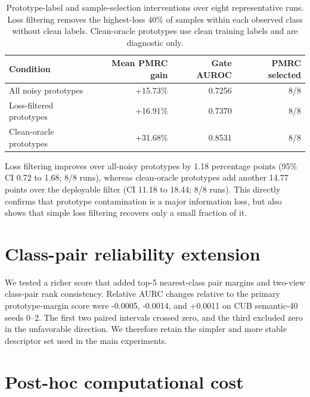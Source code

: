 \documentclass[11pt,a4paper]{article}
\begin{document}
\begin{table}[H]
\centering
\caption{Prototype-label and sample-selection interventions over eight representative runs. Loss filtering removes the highest-loss 40\% of samples within each observed class without clean labels. Clean-oracle prototypes use clean training labels and are diagnostic only.}
\label{tab:prototype-purification}
\small
\begin{tabular}{@{}lrrr@{}}
\toprule
Condition & Mean PMRC gain & Gate AUROC & PMRC selected \\
\midrule
All noisy prototypes & +15.73\% & 0.7256 & 8/8 \\
Loss-filtered prototypes & +16.91\% & 0.7370 & 8/8 \\
Clean-oracle prototypes & +31.68\% & 0.8531 & 8/8 \\
\bottomrule
\end{tabular}
\end{table}

Loss filtering improves over all-noisy prototypes by 1.18 percentage points
(95\% CI 0.72 to 1.68; 8/8 runs), whereas clean-oracle prototypes add another
14.77 points over the deployable filter (CI 11.18 to 18.44; 8/8 runs). This
directly confirms that prototype contamination is a major information loss, but
also shows that simple loss filtering recovers only a small fraction of it.

\section{Class-pair reliability extension}

We tested a richer score that added top-5 nearest-class pair margins and
two-view class-pair rank consistency. Relative AURC changes relative to the
primary prototype-margin score were -0.0005, -0.0014, and +0.0011 on CUB
semantic-40 seeds 0--2. The first two paired intervals crossed zero, and the
third excluded zero in the unfavorable direction. We therefore retain the
simpler and more stable descriptor set used in the main experiments.

\section{Post-hoc computational cost}
\end{document}
